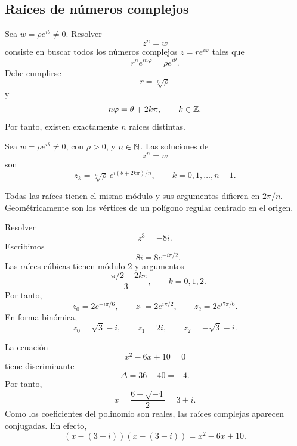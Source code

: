 \subsection{Raíces de números complejos}

Sea \(w=\rho e^{i\theta}\neq0\). Resolver
\[
z^n=w
\]
consiste en buscar todos los números complejos \(z=re^{i\varphi}\) tales que
\[
r^ne^{in\varphi}=\rho e^{i\theta}.
\]
Debe cumplirse
\[
r=\sqrt[n]{\rho}
\]
y
\[
n\varphi=\theta+2k\pi,
\qquad k\in\mathbb{Z}.
\]
Por tanto, existen exactamente \(n\) raíces distintas.

\begin{proposition}
Sea \(w=\rho e^{i\theta}\neq0\), con \(\rho>0\), y \(n\in\mathbb{N}\). Las soluciones de
\[
z^n=w
\]
son
\[
z_k=\sqrt[n]{\rho}\,e^{i(\theta+2k\pi)/n},
\qquad k=0,1,\ldots,n-1.
\]
\end{proposition}

Todas las raíces tienen el mismo módulo y sus argumentos difieren en \(2\pi/n\). Geométricamente son los vértices de un polígono regular centrado en el origen.

\begin{example}
Resolver
\[
z^3=-8i.
\]
Escribimos
\[
-8i=8e^{-i\pi/2}.
\]
Las raíces cúbicas tienen módulo \(2\) y argumentos
\[
\frac{-\pi/2+2k\pi}{3},\qquad k=0,1,2.
\]
Por tanto,
\[
z_0=2e^{-i\pi/6},\qquad
z_1=2e^{i\pi/2},\qquad
z_2=2e^{i7\pi/6}.
\]
En forma binómica,
\[
z_0=\sqrt3-i,
\qquad
z_1=2i,
\qquad
z_2=-\sqrt3-i.
\]
\end{example}

\begin{center}
\end{center}

\begin{example}
La ecuación
\[
x^2-6x+10=0
\]
tiene discriminante
\[
\Delta=36-40=-4.
\]
Por tanto,
\[
x=\frac{6\pm\sqrt{-4}}2=3\pm i.
\]
Como los coeficientes del polinomio son reales, las raíces complejas aparecen conjugadas. En efecto,
\[
(x-(3+i))(x-(3-i))=x^2-6x+10.
\]
\end{example}

